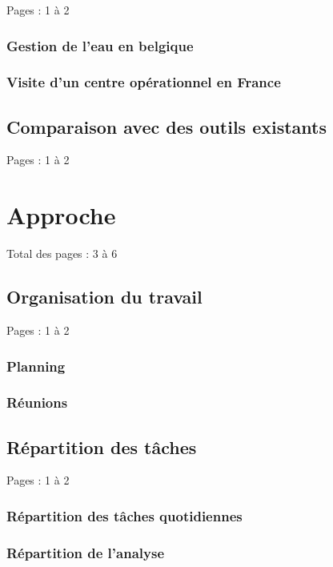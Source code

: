 \documentclass{eplmastersthesis_FR}
\begin{document}
			Pages : 1 à 2

			\subsection*{Gestion de l'eau en belgique}
			\subsection*{Visite d'un centre opérationnel en France}

		\section{Comparaison avec des outils existants}

			Pages : 1 à 2



	\chapter{Approche}

		Total des pages : 3 à 6

		\section{Organisation du travail}

			Pages : 1 à 2

			\subsection*{Planning}
			\subsection*{Réunions}

		\section{Répartition des tâches}

			Pages : 1 à 2

			\subsection*{Répartition des tâches quotidiennes}
			\subsection*{Répartition de l'analyse}
\end{document}
